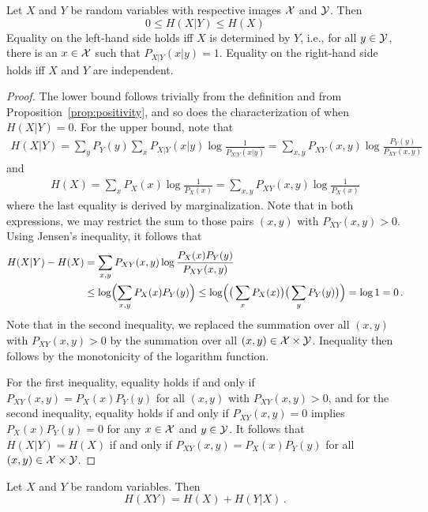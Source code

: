 \begin{proposition}\label{prop:conditional-bounds}
Let $X$ and $Y$ be random variables with respective images ${\cal X}$ and $\cal Y$. Then
\[
0 \leq H(X|Y) \leq H(X)
\]
Equality on the left-hand side holds iff $X$ is determined by $Y$,
i.e., for all $y\in {\cal Y}$, there is an $x\in {\cal X}$ such that
$P_{X|Y}(x|y)=1$.
Equality on the right-hand side holds iff
$X$ and $Y$ are independent.
\end{proposition}
%
\begin{proof}
The lower bound follows trivially from the definition and from Proposition~\ref{prop:positivity}, and so does the characterization of when $H(X|Y) = 0$. For the upper bound, note that
\begin{align}
H(X|Y) = \sum_{y} P_Y(y) \sum_x P_{X|Y}(x|y) \log\frac{1}{P_{X|Y}(x|y)} = \sum_{x,y} P_{XY}(x,y) \log\frac{P_Y(y)}{P_{XY}(x,y)}
\end{align}
and
\begin{align}
H(X) = \sum_x P_{X}(x) \log\frac{1}{P_{X}(x)} = \sum_{x,y} P_{XY}(x,y) \log\frac{1}{P_{X}(x)}
\end{align}
where the last equality is derived by marginalization. Note that in both expressions, we may restrict the sum to those pairs $(x,y)$ with $P_{XY}(x,y) > 0$. 
Using Jensen's inequality, it follows that
\begin{align}
H(X|Y) - H(X) &= \sum_{x,y} P_{XY}(x,y)\log
\frac{P_X(x)P_Y(y)}{P_{XY}(x,y)} \nonumber \\
&\leq \log\Bigl( \sum_{x,y} P_X(x)P_Y(y) \Bigr) \leq \log\Bigl(\big(\sum_{x}P_X(x)\big)\big(\sum_{y}P_Y(y)\big)\Bigr) = \log 1 = 0 \, .
\end{align}
Note that in the second inequality, we replaced the summation over all $(x,y)$ with $P_{XY}(x,y) > 0$ by the summation over all $(x,y) \in {\cal X} \times {\cal Y}$. Inequality then follows by the monotonicity of the logarithm function.

For the first inequality, equality holds if and only if $P_{XY}(x,y) = P_X(x) P_Y(y)$ for all $(x,y)$ with $P_{XY}(x,y) > 0$, and for the second inequality, equality holds if and only if $P_{XY}(x,y) = 0$ implies $P_X(x) P_Y(y) = 0$ for any $x \in \cal X$ and $y \in \cal Y$. It follows that $H(X|Y) = H(X)$ if and only if $P_{XY}(x,y) = P_X(x) P_Y(y)$ for all $(x,y) \in {\cal X} \times {\cal Y}$. 
\end{proof}


\begin{proposition} 
Let $X$ and $Y$ be random variables. Then
\[
H(XY)= H(X) + H(Y|X) \, .
\]
\end{proposition}

